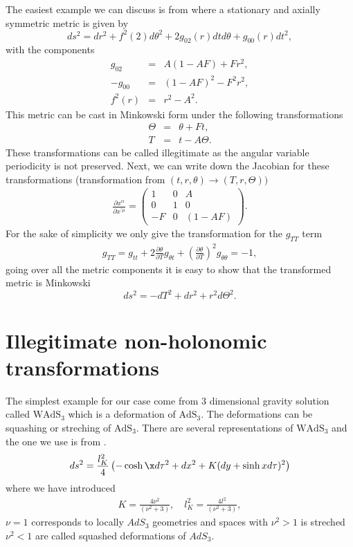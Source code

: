 \documentclass[preprint,aps,tightenlines,showkeys,nofootinbib,superscriptaddress,amsmath]{revtex4}
\begin{document}
The easiest example we can discuss is from \cite{Deser:1985pk} where a
stationary and axially symmetric metric is given by
\begin{equation}
  ds^{2}= dr^{2}+f^{2}(2)d \theta^{2}+2g_{02}(r)dt d\theta +g_{00}(r)dt^{2},
\end{equation}
with the components
\begin{eqnarray}
  g_{02}& = &A(1-AF)+Fr^{2},\\
  -g_{00}& =&(1-AF)^{2}-F^{2}r^{2},\\
  f^{2}(r)&=&r^{2}-A^{2}.
\end{eqnarray}
This metric can be cast in Minkowski form under the following transformations
\begin{eqnarray}
  \Theta &=&\theta+Ft,\\
  T &=&t-A\Theta.
\end{eqnarray}
These transformations can be called illegitimate as the angular
variable periodicity is not preserved. Next, we can write down the
Jacobian for these transformations (transformation from
$(t,r,\theta)\rightarrow (T,r,\Theta))$
\begin{eqnarray}
  \frac{\partial x^{\alpha} }{\partial x^{\prime\mu} }=
  \begin{pmatrix}
    1 & 0 & A \\
    0 & 1 & 0 \\
    -F & 0 & (1-AF)
  \end{pmatrix}.
\end{eqnarray}
For the sake of simplicity we only give the transformation for the $g_{TT}$ term
\begin{eqnarray}
  g_{TT}=g_{tt}+2 \frac{\partial\theta}{\partial T} g_{\theta
  t}+\left(\frac{\partial\theta}{\partial T}\right)^{2}g_{\theta \theta }=-1,
\end{eqnarray}
going over all the metric components it is easy to show that the
transformed metric is Minkowski
\begin{equation}
  ds^{2}=-dT^{2}+ dr^{2}+r^{2}d\Theta^{2}.
\end{equation}
\section{Illegitimate non-holonomic transformations}
The simplest example for our case come from 3 dimensional gravity
solution called $\text{WAdS}_{3}$ which is a deformation of
$\text{AdS}_3$. The deformations can be squashing or streching of
$\text{AdS}_3$. There are several representations of
$\text{WAdS}_{3}$ and the one we use is from \cite{Giribet:2015lfa}.
\begin{equation}
  ds^{2}=\dfrac{l^{2}_K}{4}\left(-\cosh\x d\tau^{2}+dx^{2}+K(dy+\sinh
  x d\tau )^{2}   \right)
\end{equation}
where we have introduced
\begin{eqnarray}
  K=\frac{4\nu^{2}}{(\nu ^{2}+3 )},\quad l_{K}^{2}=\frac{4l^{2}
  }{(\nu ^{2}+3 )},
\end{eqnarray}
$\nu =1$ corresponds to locally $AdS_3$ geometries and spaces with
$\nu ^{2}>1$ is streched $\nu ^{2}<1$ are called squashed
deformations of $AdS_3$.
\end{document}
